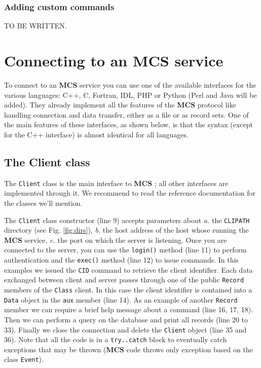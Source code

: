 \documentclass[12pt,titlepage]{article}
\newcommand{\mcs}{\textbf{MCS} }
\begin{document}
\subsubsection{Adding custom commands}
TO BE WRITTEN.

%
%
\newpage
\section{Connecting to an \mcs service}
To connect to an \mcs service you can use one of the available
interfaces for the various languages: C++, C, Fortran, IDL, PHP or Python
(Perl and Java will be added). They already implement all the
features of the \mcs protocol like handling connection and data
transfer, either as a file or as record sets. One of the main features
of these interfaces, as shown below, is that the syntax (except for
the C++ interface) is almost identical for all languages.

\subsection{The Client class}\label{sec:Clientclass}
The \verb|Client| class is the main interface to \mcs; all other
interfaces are implemented through it. We recommend to read the
reference documentation for the classes we'll mention.

\bigskip
%
%
\noindent The \verb|Client| class constructor (line 9) accepts
parameters about \emph{a.} the \verb|CLIPATH| directory (see
Fig. \ref{fig:dirs}),  \emph{b.} the host address of the host whose running the
\mcs service, \emph{c.} the port on which the server is listening. Once you
are connected to the server, you can use the \verb|login()| method (line 11)
to perform authentication and the \verb|exec()| method (line 12) to
issue commands. In this examples we issued the \verb|CID| command to
retrieve the client identifier. Each data exchanged between client and
server passes through one of the public \verb|Record| members of the
\verb|Class| client. In this case the client identifier is contained
into a \verb|Data| object in the \verb|aux| member (line 14). As an
example of another \verb|Record| member we can require a brief help
message about a command (line 16, 17, 18). Then we can perform a query
on the database and print all records (line 20 to 33). Finally we
close the connection and delete the \verb|Client| object (line 35 and
36). Note that all the code is in a \verb|try..catch| block to
eventually catch exceptions that may be thrown (\mcs code throws only
exception based on the class \verb|Event|).
\end{document}
